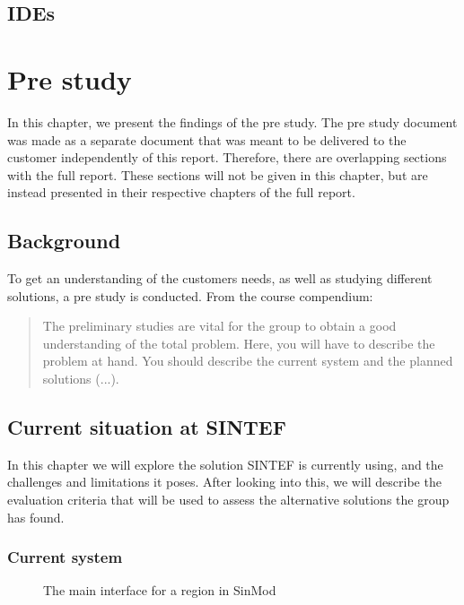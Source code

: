 \documentclass[11pt,a4paper,titlepage,oneside]{report}
\begin{document}
\section{IDEs}

\chapter{Pre study}
In this chapter, we present the findings of the pre study. The pre study document was made as a separate document that was meant to be delivered to the customer independently of this report. Therefore, there are overlapping sections with the full report. These sections will not be given in this chapter, but are instead presented in their respective chapters of the full report. 

\section{Background}
To get an understanding of the customers needs, as well as studying different solutions, a pre study is conducted. From the course compendium:
\begin{quote}
The preliminary studies are vital for the group to obtain a good understanding of the total problem.
Here, you will have to describe the problem at hand. You should describe the current system and the
planned solutions (...).
\cite{TDT4290:Intro}
\end{quote}

\section{Current situation at SINTEF}
In this chapter we will explore the solution SINTEF is currently using, and the challenges and limitations it poses. After looking into this, we will describe the evaluation criteria that will be used to assess the alternative solutions the group has found. 
\subsection{Current system}
\begin{figure}[h]
\begin{center}
\caption{The main interface for a region in SinMod}
\label{fig:sinmod-region-main-interface}
\end{center}
\end{figure}
\end{document}
